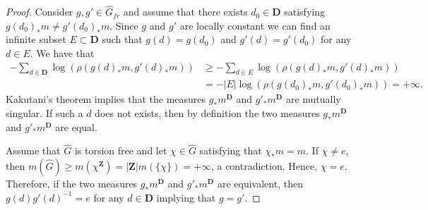 \documentclass[a4paper,12pt]{amsart}
\numberwithin{equation}{section}
\theoremstyle{definition}
\newcommand{\D}{\mathbf D}
\newcommand{\wh}{\widehat}
\newcommand{\Z}{\mathbf{Z}}
\begin{document}
\begin{proof}
Consider $g,g'\in \wh G_{fr}$ and assume that there exists $d_0\in\D$ satisfying $g(d_0)_*m\neq g'(d_0)_*m$.
Since $g$ and $g'$ are locally constant we can find an infinite subset $E\subset\D$ such that $g(d ) =g(d_0)$ and $g'(d ) =g'(d_0)$ for any $d\in E.$
We have that 
\begin{align*}
 - \sum_{d\in\D} \log(\rho( g(d)_* m , g'(d)_*m)) & \geq - \sum_{d\in E} \log(\rho( g(d)_* m , g'(d)_* m))\\
 & = - | E | \log(\rho( g(d_0)_*m , g'(d_0)_*m ) )  = +\infty.
 \end{align*}
Kakutani's theorem implies that the measures $g_*m^\D$ and $g'_*m^\D$ are mutually singular.
If such a $d$ does not exists, then by definition the two measures $g_*m^\D$ and $g'_*m^\D$ are equal.

Assume that $\wh G$ is torsion free and let $\chi\in\wh G$ satisfying that $\chi_*m=m.$
If $\chi\neq e$, then $m(\wh G)\geq m(\chi^\Z) = | \Z | m(\{\chi\}) = +\infty$, a contradiction.
Hence, $\chi=e$.
Therefore, if the two measures $g_*m^\D$ and $g'_* m^\D$ are equivalent, then $g(d)g'(d)^{-1}=e$ for any $d\in\D$ implying that $g=g'.$
\end{proof}
\end{document}
